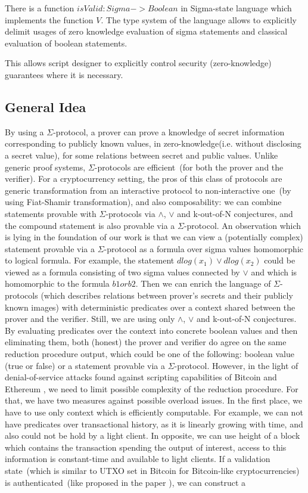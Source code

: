 \documentclass[11pt]{llncs}
\newcommand{\authnote}[2]{\marginpar{\parbox{\marginparwidth}{\tiny %
  \textsf{#1 {\textcolor{blue}{notes: #2}}}}}%
  \textcolor{blue}{\textbf{\dag}}}
\newcommand{\authnote}[2]{
  \textsf{#1 \textcolor{blue}{: #2}}}
\newcommand{\authnote}[2]{}
\newcommand{\knote}[1]{{\authnote{\textcolor{green}{kushti notes}}{#1}}}
\begin{document}
There is a function $isValid: Sigma -> Boolean$ in Sigma-state language which implements the function $V$.
The type system of the language allows to explicitly delimit usages of zero knowledge evaluation
of sigma statements and classical evaluation of boolean statements.

This allows script designer to explicitly control security (zero-knowledge) guarantees where it is necessary.

\subsection{General Idea}

By using a $\Sigma$-protocol, a prover can prove a knowledge of secret information corresponding to publicly known values, in zero-knowledge(i.e. without disclosing a secret value), for some relations between secret and public values. Unlike generic proof systems, $\Sigma$-protocols are efficient~(for both the prover and the verifier). For a cryptocurrency setting, the pros of this class of protocols are generic transformation from an interactive protocol to non-interactive one~(by using Fiat-Shamir transformation), and also composability: we can combine statements provable with $\Sigma$-protocols via $\land$, $\lor$ and k-out-of-N conjectures, and the compound statement is also provable via a $\Sigma$-protocol. An observation which is lying in the foundation of our work is that we can view a (potentially complex) statement provable via a $\Sigma$-protocol as a formula over sigma values homomorphic to logical formula. For example, the statement $dlog(x_1) \lor dlog(x_2)$ could be viewed as a formula consisting of two sigma values connected by $\lor$ and which is homomorphic to the formula $b1 or b2$. Then we can enrich the language of $\Sigma$-protocols (which describes relations between prover's secrets and their publicly known images) with deterministic predicates over a context shared between the prover and the verifier. Still, we are using only $\land$, $\lor$ and k-out-of-N conjectures. By evaluating predicates over the context into concrete boolean values and then eliminating them, both (honest) the prover and verifier do agree on the same reduction procedure output, which could be one of the following: boolean value (true or false) or a statement provable via a $\Sigma$-protocol. However, in the light of denial-of-service attacks found against scripting capabilities of Bitcoin and Ethereum \knote{todo: links}, we need to limit possible complexity of the reduction procedure. For that, we have two measures against possible overload issues. In the first place, we have to use only context which is efficiently computable. For example, we can not have predicates over transactional history, as it is linearly growing with time, and also could not be hold by a light client. In opposite, we can use height of a block which contains the transaction spending the output of interest, access to this information is constant-time and available to light clients. If a validation state~(which is similar to UTXO set in Bitcoin for Bitcoin-like cryptocurrencies) is authenticated~(like proposed in the paper \knote{cite AVL paper}), we can construct a 
\end{document}
